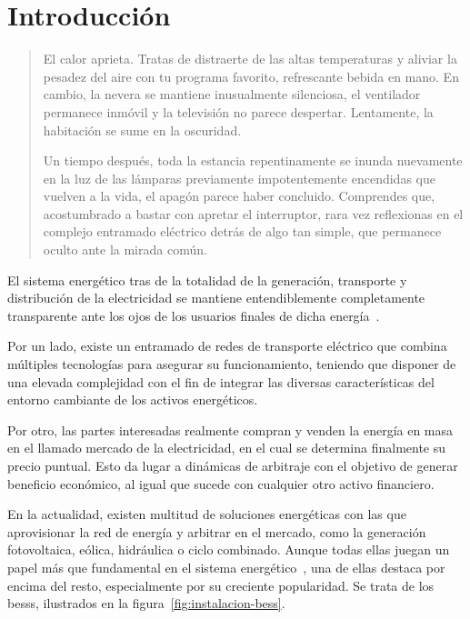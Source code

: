 
\cleardoublepage%

\chapter{Introducción}%
\label{makereference1}

\begin{quotation}

  El calor aprieta. Tratas de distraerte de las altas temperaturas y aliviar la pesadez del aire con tu programa favorito, refrescante bebida en mano. En cambio, la nevera se mantiene inusualmente silenciosa, el ventilador permanece inmóvil y la televisión no parece despertar. Lentamente, la habitación se sume en la oscuridad.

  Un tiempo después, toda la estancia repentinamente se inunda nuevamente en la luz de las lámparas previamente impotentemente encendidas que vuelven a la vida, el apagón parece haber concluido. Comprendes que, acostumbrado a bastar con apretar el interruptor, rara vez reflexionas en el complejo entramado eléctrico detrás de algo tan simple, que permanece oculto ante la mirada común.

\end{quotation}

El sistema energético tras de la totalidad de la generación, transporte y distribución de la electricidad se mantiene entendiblemente completamente transparente ante los ojos de los usuarios finales de dicha energía~\cite{garrues2009red}.

Por un lado, existe un entramado de redes de transporte eléctrico que combina múltiples tecnologías para asegurar su funcionamiento, teniendo que disponer de una elevada complejidad con el fin de integrar las diversas características del entorno cambiante de los activos energéticos.

Por otro, las partes interesadas realmente compran y venden la energía en masa en el llamado mercado de la electricidad, en el cual se determina finalmente su precio puntual. Esto da lugar a dinámicas de arbitraje con el objetivo de generar beneficio económico, al igual que sucede con cualquier otro activo financiero.

En la actualidad, existen multitud de soluciones energéticas con las que aprovisionar la red de energía y arbitrar en el mercado, como la generación fotovoltaica, eólica, hidráulica o ciclo combinado. Aunque todas ellas juegan un papel más que fundamental en el sistema energético~\cite{turkenburg2000renewable}, una de ellas destaca por encima del resto, especialmente por su creciente popularidad. Se trata de los \glspl{bess}, ilustrados en la figura~\ref{fig:instalacion-bess}.

